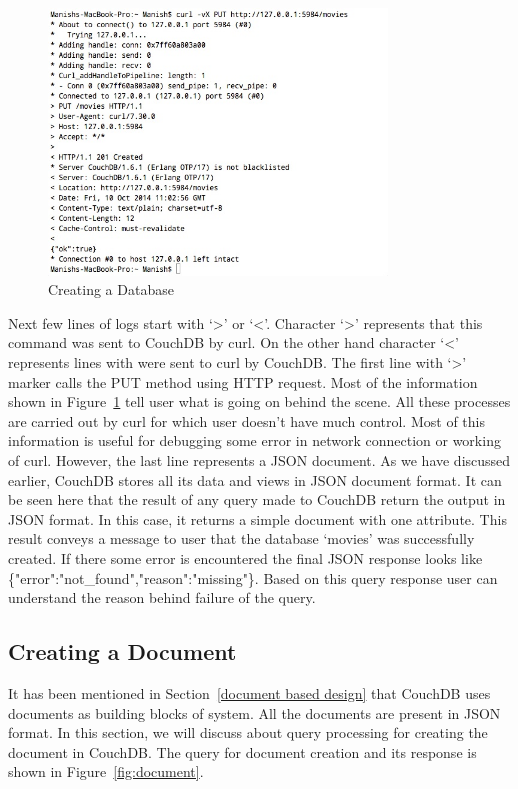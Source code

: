 \documentclass{sig-alternate}
\begin{document}
\begin{figure}
\centering
\includegraphics[width=90mm]{create.jpg}
\caption{Creating a Database \label{fig:create}}
\end{figure}

Next few lines of logs start with `>' or `<'. Character `>' represents that this command was sent to CouchDB by curl. On the other hand character `<' represents lines with were sent to curl by CouchDB. The first line with `>' marker calls the PUT method using HTTP request. Most of the information shown in Figure~\ref{fig:create} tell user what is going on behind the scene. All these processes are carried out by curl for which user doesn't have much control. Most of this information is useful for debugging some error in network connection or working of curl. However, the last line represents a JSON document. As we have discussed earlier, CouchDB stores all its data and views in JSON document format. It can be seen here that the result of any query made to CouchDB return the output in JSON format. In this case, it returns a simple document with one attribute. This result conveys a message to user that the database `movies' was successfully created. If there some error is encountered the final JSON response looks like \{"error":"not\_found","reason":"missing"\}. Based on this query response user can understand the reason behind failure of the query.

\subsection{Creating a Document}
\label{Create Document}
It has been mentioned in Section~\ref{document based design} that CouchDB uses documents as building blocks of system. All the documents are present in JSON format. In this section, we will discuss about query processing for creating the document in CouchDB. The query for document creation and its response is shown in Figure~\ref{fig:document}.
\end{document}
